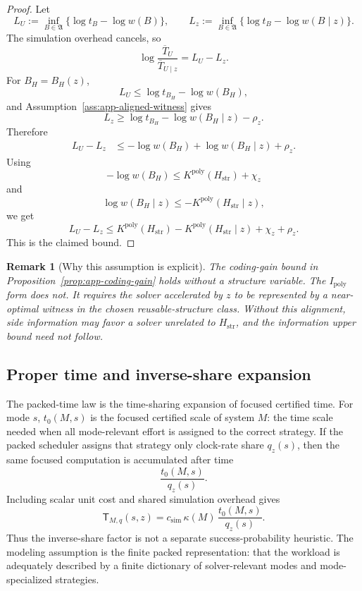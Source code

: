 \documentclass{article}
\newtheorem{remark}{Remark}
\begin{document}
\begin{proof}
Let
\[
    L_U:=\inf_{B\in\mathfrak A}\{\log t_B-\log w(B)\},
    \qquad
    L_z:=\inf_{B\in\mathfrak A}\{\log t_B-\log w(B\mid z)\}.
\]
The simulation overhead cancels, so
\[
    \log\frac{\overline T_U}{\overline T_{U\mid z}}
    =
    L_U-L_z.
\]
For \(B_H=B_H(z)\),
\[
    L_U
    \le
    \log t_{B_H}-\log w(B_H),
\]
and Assumption~\ref{ass:app-aligned-witness} gives
\[
    L_z
    \ge
    \log t_{B_H}-\log w(B_H\mid z)-\rho_z.
\]
Therefore
\[
\begin{aligned}
    L_U-L_z
    &\le
    -\log w(B_H)+\log w(B_H\mid z)+\rho_z.
\end{aligned}
\]
Using
\[
    -\log w(B_H)
    \le
    K^{\mathrm{poly}}(H_{\mathrm{str}})+\chi_z
\]
and
\[
    \log w(B_H\mid z)
    \le
    -K^{\mathrm{poly}}(H_{\mathrm{str}}\mid z),
\]
we get
\[
    L_U-L_z
    \le
    K^{\mathrm{poly}}(H_{\mathrm{str}})
    -
    K^{\mathrm{poly}}(H_{\mathrm{str}}\mid z)
    +
    \chi_z+\rho_z.
\]
This is the claimed bound.
\end{proof}

\begin{remark}[Why this assumption is explicit]
The coding-gain bound in Proposition~\ref{prop:app-coding-gain} holds without a structure
variable.  The \(I_{\mathrm{poly}}\) form does not.  It requires the solver accelerated by
\(z\) to be represented by a near-optimal witness in the chosen reusable-structure class.
Without this alignment, side information may favor a solver unrelated to
\(H_{\mathrm{str}}\), and the information upper bound need not follow.
\end{remark}

\subsection{Proper time and inverse-share expansion}
\label{app:proper-time-inverse-share}

The packed-time law is the time-sharing expansion of focused certified time.
For mode \(s\), \(t_0(M,s)\) is the focused certified scale of system \(M\): the time
scale needed when all mode-relevant effort is assigned to the correct strategy.
If the packed scheduler  assigns that strategy only clock-rate share \(q_z(s)\), then the
same focused computation is accumulated after time
\[
    \frac{t_0(M,s)}{q_z(s)}.
\]
Including scalar unit cost and shared simulation overhead gives
\[
    \mathsf T_{M,q}(s,z)
    =
    c_{\mathrm{sim}}\,
    \kappa(M)\,
    \frac{t_0(M,s)}{q_z(s)}.
\]
Thus the inverse-share factor is not a separate success-probability heuristic.
The modeling assumption is the finite packed representation: that the workload is
adequately described by a finite dictionary of solver-relevant modes and mode-specialized
strategies.
\end{document}
